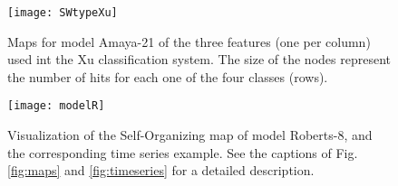 \documentclass[utf8]{frontiersSCNS} %
\begin{document}
%		
%		
%		
\begin{figure}[h!]\centering
	\texttt{[image: SWtypeXu]}
	\caption{Maps for model Amaya-21 of the three features (one per column) used int the Xu classification system. The size of the nodes represent the number of hits for each one of the four classes (rows).}\label{fig:SWtXu}
\end{figure}

\begin{figure}[h!]
	\texttt{[image: modelR]}\\%
	\caption{Visualization of the Self-Organizing map of model Roberts-8, and the corresponding time series example. See the captions of Fig.\ref{fig:maps}  and \ref{fig:timeseries} for a detailed description.}\label{fig:modelR}
\end{figure}
\end{document}
